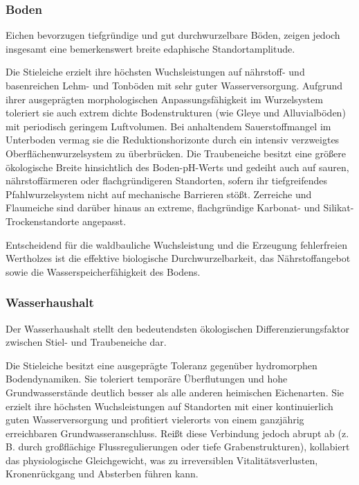 \documentclass[twocolumn, bibliography=totoc, abstract=true]{scrartcl}
\begin{document}
\subsubsection{Boden}

Eichen bevorzugen tiefgründige und gut durchwurzelbare Böden, zeigen jedoch insgesamt eine bemerkenswert breite edaphische Standortamplitude.

Die Stieleiche erzielt ihre höchsten Wuchsleistungen auf nährstoff- und basenreichen Lehm- und Tonböden mit sehr guter Wasserversorgung. Aufgrund ihrer ausgeprägten morphologischen Anpassungsfähigkeit im Wurzelsystem toleriert sie auch extrem dichte Bodenstrukturen (wie Gleye und Alluvialböden) mit periodisch geringem Luftvolumen. Bei anhaltendem Sauerstoffmangel im Unterboden vermag sie die Reduktionshorizonte durch ein intensiv verzweigtes Oberflächenwurzelsystem zu überbrücken. Die Traubeneiche besitzt eine größere ökologische Breite hinsichtlich des Boden-pH-Werts und gedeiht auch auf sauren, nährstoffärmeren oder flachgründigeren Standorten, sofern ihr tiefgreifendes Pfahlwurzelsystem nicht auf mechanische Barrieren stößt. Zerreiche und Flaumeiche sind darüber hinaus an extreme, flachgründige Karbonat- und Silikat-Trockenstandorte angepasst.

Entscheidend für die waldbauliche Wuchsleistung und die Erzeugung fehlerfreien Wertholzes ist die effektive biologische Durchwurzelbarkeit, das Nährstoffangebot sowie die Wasserspeicherfähigkeit des Bodens.

\subsubsection{Wasserhaushalt}

Der Wasserhaushalt stellt den bedeutendsten ökologischen Differenzierungsfaktor zwischen Stiel- und Traubeneiche dar.

Die Stieleiche besitzt eine ausgeprägte Toleranz gegenüber hydromorphen Bodendynamiken. Sie toleriert temporäre Überflutungen und hohe Grundwasserstände deutlich besser als alle anderen heimischen Eichenarten. Sie erzielt ihre höchsten Wuchsleistungen auf Standorten mit einer kontinuierlich guten Wasserversorgung und profitiert vielerorts von einem ganzjährig erreichbaren Grundwasseranschluss. Reißt diese Verbindung jedoch abrupt ab (z.\,B. durch großflächige Flussregulierungen oder tiefe Grabenstrukturen), kollabiert das physiologische Gleichgewicht, was zu irreversiblen Vitalitätsverlusten, Kronenrückgang und Absterben führen kann.
\end{document}
